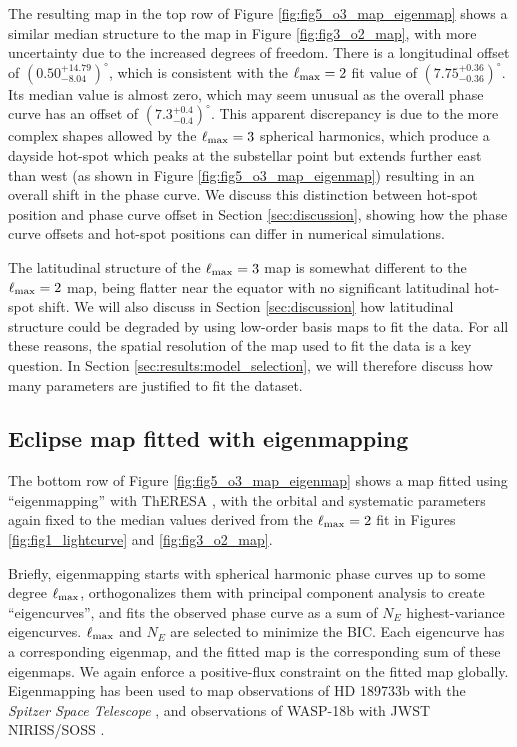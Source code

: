 \documentclass[twocolumn]{aastex631}
\begin{document}
The resulting map in the top row of Figure \ref{fig:fig5_o3_map_eigenmap} shows a similar median structure to the map in Figure \ref{fig:fig3_o2_map}, with more uncertainty due to the increased degrees of freedom. There is a longitudinal offset of $(0.50^{+14.79}_{-8.04})^{\circ}$, which  is consistent with the $\ell_{\rm max}=2$ fit value of $(7.75^{+0.36}_{-0.36})^{\circ}$. Its median value is almost zero, which may seem unusual as the overall phase curve has an offset of $(7.3^{+0.4}_{-0.4})^{\circ}$. This apparent discrepancy is due to the more complex shapes allowed by the $\ell_{\rm max}=3$ spherical harmonics, which produce a dayside hot-spot which peaks at the substellar point but extends further east than west (as shown in Figure \ref{fig:fig5_o3_map_eigenmap}) resulting in an overall shift in the phase curve. We discuss this distinction between hot-spot position and phase curve offset in Section \ref{sec:discussion}, showing how the phase curve offsets and hot-spot positions can differ in numerical simulations. 

The latitudinal structure of the $\ell_{\rm max}=3$ map is somewhat different to the $\ell_{\rm max}=2$ map, being flatter near the equator with no significant latitudinal hot-spot shift. We will also discuss in Section \ref{sec:discussion} how latitudinal structure could be degraded by using low-order basis maps to fit the data. For all these reasons, the spatial resolution of the map used to fit the data is a key question. In Section \ref{sec:results:model_selection}, we will therefore discuss how many parameters  are justified to fit the dataset.


\subsection{Eclipse map fitted with eigenmapping}\label{sec:results:eigenmap}

The bottom row of Figure \ref{fig:fig5_o3_map_eigenmap} shows a map fitted using ``eigenmapping'' \citep{rauscher2018eigenmap} with ThERESA \citep{challener2022theresa}, with the orbital and systematic parameters again fixed to the median values derived from the $\ell_{\rm max}=2$ fit in Figures \ref{fig:fig1_lightcurve} and \ref{fig:fig3_o2_map}.

Briefly, eigenmapping starts with spherical harmonic phase curves up to some degree $\ell_{\rm max}$, orthogonalizes them with principal component analysis to create ``eigencurves'', and fits the observed phase curve as a sum of $N_E$ highest-variance eigencurves. $\ell_{\rm max}$ and $N_E$ are selected to minimize the BIC. Each eigencurve has a corresponding eigenmap, and the fitted map is the corresponding sum of these eigenmaps. We again enforce a positive-flux constraint on the fitted map globally. Eigenmapping has been used to map  observations of HD 189733b with the \textit{Spitzer Space Telescope} \citep{rauscher2018eigenmap, challener2022theresa}, and observations of WASP-18b with JWST NIRISS/SOSS \citep{coulombe2023wasp18b}. 
\end{document}
